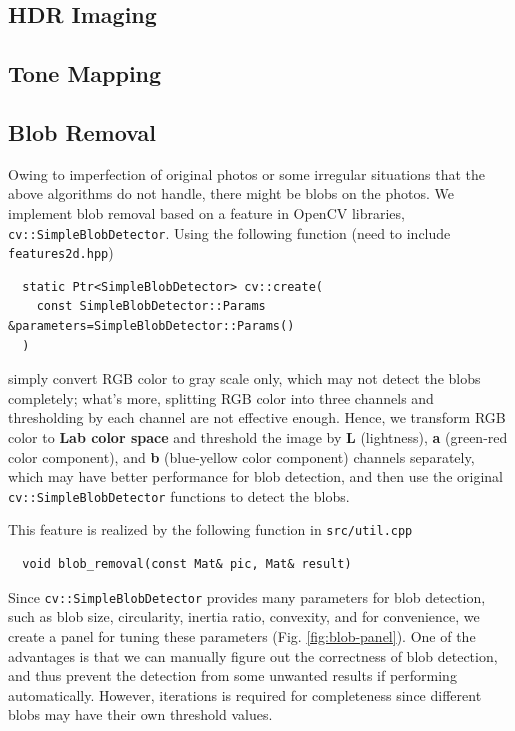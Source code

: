 \documentclass[11pt]{article}
\begin{document}
\subsection{HDR Imaging}

\subsection{Tone Mapping}

\subsection{Blob Removal}
Owing to imperfection of original photos or some irregular situations that the above algorithms do not handle, there might be blobs on the photos. We implement blob removal based on a feature in OpenCV libraries, \texttt{cv::SimpleBlobDetector}. Using the following function (need to include \texttt{features2d.hpp})
\begin{lstlisting}
  static Ptr<SimpleBlobDetector> cv::create(
    const SimpleBlobDetector::Params &parameters=SimpleBlobDetector::Params()
  )
\end{lstlisting}
simply convert RGB color to gray scale only, which may not detect the blobs completely; what's more, splitting RGB color into three channels and thresholding by each channel are not effective enough. Hence, we transform RGB color to \textbf{Lab color space} and threshold the image by \textbf{L} (lightness), \textbf{a} (green-red color component), and \textbf{b} (blue-yellow color component) channels separately, which may have better performance for blob detection, and then use the original \texttt{cv::SimpleBlobDetector} functions to detect the blobs.

This feature is realized by the following function in \texttt{src/util.cpp}
\begin{lstlisting}
  void blob_removal(const Mat& pic, Mat& result)
\end{lstlisting}
Since \texttt{cv::SimpleBlobDetector} provides many parameters for blob detection, such as blob size, circularity, inertia ratio, convexity, and for convenience, we create a panel for tuning these parameters (Fig. \ref{fig:blob-panel}). One of the advantages is that we can manually figure out the correctness of blob detection, and thus prevent the detection from some unwanted results if performing automatically. However, iterations is required for completeness since different blobs may have their own threshold values.
\end{document}
